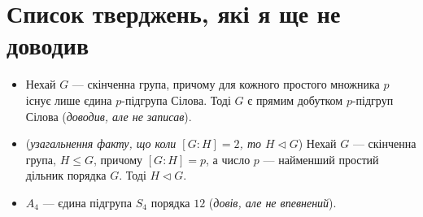 \documentclass{math_library}
\begin{document}
\section*{Список тверджень, які я ще не доводив}
\begin{itemize}[wide=0pt]
\item Нехай $G$ --- скінченна група, причому для кожного простого множника $p$ існує лише єдина $p$-підгрупа Сілова. Тоді $G$ є прямим добутком $p$-підгруп Сілова (\textit{доводив, але не записав}).

\item (\textit{узагальнення факту, що коли $[G:H] = 2$, то $H \triangleleft G$}) Нехай $G$ --- скінченна група, $H \leq G$, причому $[G:H] = p$, а число $p$ --- найменший простий дільник порядка $G$. Тоді $H \triangleleft G$.

\item $A_4$ --- єдина підгрупа $S_4$ порядка $12$ (\textit{довів, але не впевнений}).

\end{itemize}
\end{document}
